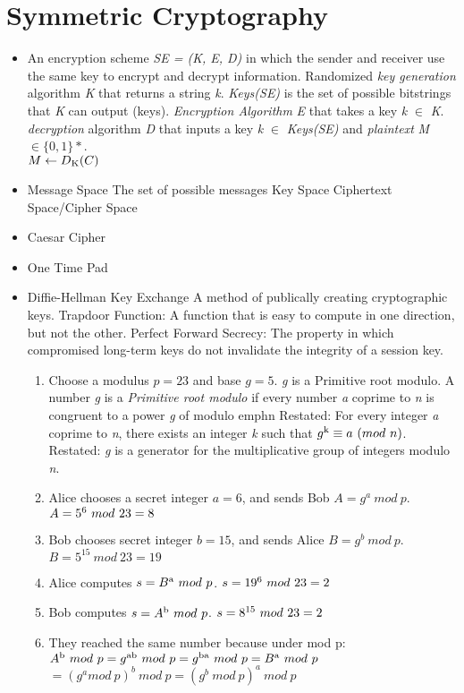 \documentclass{article}
\begin{document}
\section*{Symmetric Cryptography}
\begin{itemize}
  \item An encryption scheme \emph{SE = (K, E, D)} in which the sender and receiver use the same key to encrypt and decrypt information.
    \subitem Randomized \emph{key generation} algorithm \emph{K} that returns a string \emph{k}. \emph{Keys(SE)}  is the set of possible bitstrings that \emph{K} can output (keys).
    \subitem \emph{Encryption Algorithm}  \emph{E} that takes a key \emph{k} $ \in $ \emph{K}.
    \subitem \emph{decryption} algorithm \emph{D} that inputs a key \emph{k} $ \in $ \emph{Keys(SE)} and
    \emph{plaintext} \emph{M} $ \in  \{0, 1\}* $.\\ 
    $ M \gets D\textsubscript{K}(C) $
  \item Message Space
    \subitem The set of possible messages
    \subitem Key Space
    \subitem Ciphertext Space/Cipher Space
  \item Caesar Cipher
  \item One Time Pad
  \item Diffie-Hellman Key Exchange
    \subitem A method of publically creating cryptographic keys.
    \subitem Trapdoor Function: A function that is easy to compute in one direction, but not the other.
    \subitem Perfect Forward Secrecy: The property in which compromised long-term keys do not invalidate the 
    integrity of a session key.
    \begin{enumerate}
      \item Choose a modulus $p=23$ and base $g=5$. 
        \subitem \emph{g} is a Primitive root modulo. A number \emph{g} is a \emph{Primitive root modulo}
        if every number \emph{a} coprime to \emph{n} is congruent to a power \emph{g} of modulo emph{n}
        \subitem Restated: For every integer \emph{a} coprime to \emph{n}, there exists an integer \emph{k} such that
        $g\textsuperscript{k} \equiv a\ (mod\ n)$.
        \subitem Restated: \emph{g} is a generator for the multiplicative group of integers modulo \emph{n}.
      \item Alice chooses a secret integer $a = 6$, and sends Bob $A = g^{a}\ mod\ p$.
        \subitem $ A = 5\textsuperscript{6}\ mod\ 23 = 8$
      \item Bob chooses secret integer $b = 15$, and sends Alice $B = g^{b}\ mod\ p$.
        \subitem $B = 5^{15}\ mod\ 23 = 19 $
      \item Alice computes $ s = B\textsuperscript{a}\ mod\ p$.
        \subitem $s = 19\textsuperscript{6}\ mod\ 23 = 2$
      \item Bob computes $ s = A\textsuperscript{b}\ mod\ p$.
        \subitem $s = 8\textsuperscript{15}\ mod\ 23 = 2$
      \item They reached the same number because under mod p:
        \subitem $A\textsuperscript{b}\ mod\ p = g\textsuperscript{ab}\ mod\ p = g\textsuperscript{ba}\ mod\ p = B\textsuperscript{a}\ mod\ p$
        \subitem $= (g^{a}mod\ p)^{b}\ mod\ p = (g^{b}\ mod\ p)^{a}\ mod\ p$



\end{enumerate}
\end{itemize}
\end{document}
